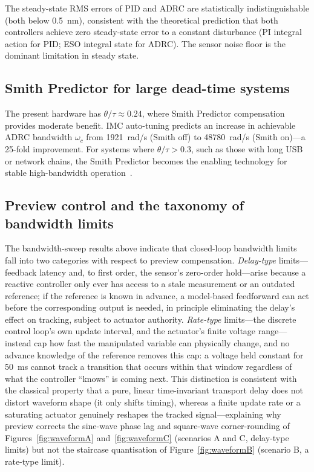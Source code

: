 \documentclass[fleqn,10pt]{wlscirep}
\begin{document}
The steady-state RMS errors of PID and ADRC are statistically indistinguishable (both below \SI{0.5}{nm}), consistent with the theoretical prediction that both controllers achieve zero steady-state error to a constant disturbance (PI integral action for PID; ESO integral state for ADRC). The sensor noise floor is the dominant limitation in steady state.

\subsection*{Smith Predictor for large dead-time systems}

The present hardware has $\theta/\tau \approx 0.24$, where Smith Predictor compensation provides moderate benefit. IMC auto-tuning predicts an increase in achievable ADRC bandwidth $\omega_c$ from \SI{1921}{rad/s} (Smith off) to \SI{48780}{rad/s} (Smith on)---a 25-fold improvement. For systems where $\theta/\tau > 0.3$, such as those with long USB or network chains, the Smith Predictor becomes the enabling technology for stable high-bandwidth operation~\cite{smith1957smith}.

\subsection*{Preview control and the taxonomy of bandwidth limits}

The bandwidth-sweep results above indicate that closed-loop bandwidth limits fall into two categories with respect to preview compensation. \emph{Delay-type} limits---feedback latency and, to first order, the sensor's zero-order hold---arise because a reactive controller only ever has access to a stale measurement or an outdated reference; if the reference is known in advance, a model-based feedforward can act before the corresponding output is needed, in principle eliminating the delay's effect on tracking, subject to actuator authority. \emph{Rate-type} limits---the discrete control loop's own update interval, and the actuator's finite voltage range---instead cap how fast the manipulated variable can physically change, and no advance knowledge of the reference removes this cap: a voltage held constant for \SI{50}{ms} cannot track a transition that occurs within that window regardless of what the controller ``knows'' is coming next. This distinction is consistent with the classical property that a pure, linear time-invariant transport delay does not distort waveform shape (it only shifts timing), whereas a finite update rate or a saturating actuator genuinely reshapes the tracked signal---explaining why preview corrects the sine-wave phase lag and square-wave corner-rounding of Figures~\ref{fig:waveformA} and~\ref{fig:waveformC} (scenarios A and C, delay-type limits) but not the staircase quantisation of Figure~\ref{fig:waveformB} (scenario B, a rate-type limit).
\end{document}
